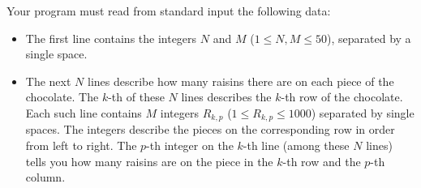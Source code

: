 Your program must read from standard input the following data:
\begin{itemize}
\item The first line contains the integers $N$ and $M$ ($1 \le N, M \le 50$), separated by a single space.

\item The next $N$ lines describe how many raisins there are on each piece of the chocolate. The $k$-th of these $N$ lines describes the $k$-th row of the chocolate. Each such line contains $M$ integers $R_{k,p}$ ($1 \le R_{k,p} \le 1000$) separated by single spaces. The integers describe the pieces on the corresponding row in order from left to right. The $p$-th integer on the $k$-th line (among these $N$ lines) tells you how many raisins are on the piece in the $k$-th row and the $p$-th column.
\end{itemize}